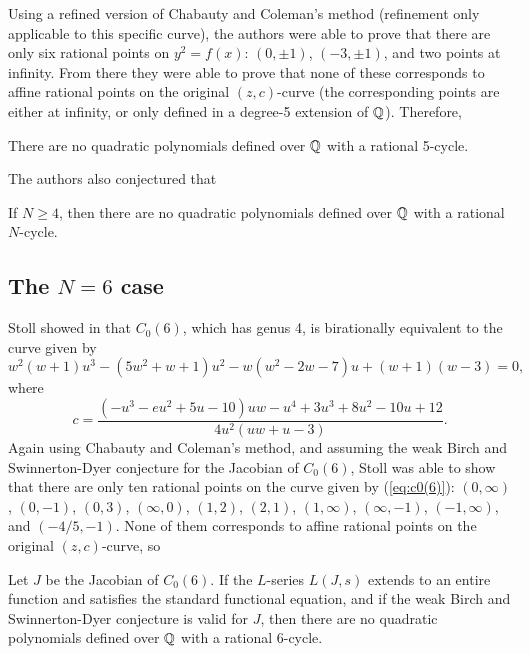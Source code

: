 Using a refined version of Chabauty and Coleman's method (refinement
only applicable to this specific curve), the authors were able to
prove that there are only six rational points on $y^2 = f(x)$: $(0,
\pm 1)$, $(-3, \pm 1)$, and two points at infinity. From there they
were able to prove that none of these corresponds to affine rational
points on the original $(z, c)$-curve (the corresponding points are
either at infinity, or only defined in a degree-5 extension of $\mathbb{Q}$).
Therefore,

\begin{theorem}
  There are no quadratic polynomials defined over $\mathbb{Q}$ with a rational
  5-cycle.
\end{theorem}

The authors also conjectured that

\begin{conjecture}
  If $N \ge 4$, then there are no quadratic polynomials defined over
  $\mathbb{Q}$ with a rational $N$-cycle.
\end{conjecture}

\subsection{The $N = 6$ case}
\label{subsec:model-6}

Stoll showed in \cite{MR2465796} that $C_0(6)$, which has genus 4, is
birationally equivalent to the curve given by
\begin{equation}
  \label{eq:c0(6)}
  w^2(w+1)u^3 - (5w^2+w+1)u^2 - w(w^2-2w-7)u + (w+1)(w-3) = 0,
\end{equation}
where
\begin{equation}
  \label{eq:c-in-uw}
  c = \frac{(-u^3-eu^2+5u-10)uw - u^4 + 3u^3 + 8u^2 - 10u +
    12}{4u^2(uw+u-3)}.
\end{equation}
Again using Chabauty and Coleman's method, and assuming the weak Birch
and Swinnerton-Dyer conjecture for the Jacobian of $C_0(6)$, Stoll was
able to show that there are only ten rational points on the curve
given by (\ref{eq:c0(6)}): $(0, \infty)$, $(0, -1)$, $(0, 3)$,
$(\infty, 0)$, $(1, 2)$, $(2, 1)$, $(1, \infty)$, $(\infty, -1)$,
$(-1, \infty)$, and $(-4/5, -1)$. None of them corresponds to affine
rational points on the original $(z, c)$-curve, so

\begin{theorem}
  Let $J$ be the Jacobian of $C_0(6)$. If the $L$-series $L(J,s)$
  extends to an entire function and satisfies the standard functional
  equation, and if the weak Birch and Swinnerton-Dyer conjecture is
  valid for $J$, then there are no quadratic polynomials defined over
  $\mathbb{Q}$ with a rational 6-cycle.
\end{theorem}

